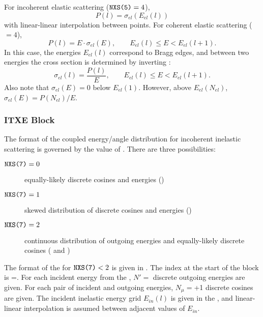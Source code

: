 For incoherent elastic scattering ($\texttt{NXS(5)}=4$),
\begin{equation}
  P(l) = \sigma_{el}(E_{el}(l))
\end{equation}
with linear-linear interpolation between points. For coherent elastic scattering ($=4$),
\begin{equation}
  P(l) = E\cdot\sigma_{el}(E), \qquad E_{el}(l) \le E < E_{el}(l+1).
  \label{eq:CoherentP}
\end{equation}
In this case, the energies $E_{el}(l)$ correspond to Bragg edges, and between two energies the cross section
is determined by inverting :
\begin{equation}
  \sigma_{el}(l) = \frac{P(l)}{E}, \qquad E_{el}(l) \le E < E_{el}(l+1).
\end{equation}
Also note that $\sigma_{el}(E)=0$ below $E_{el}(1)$. However, above $E_{el}(N_{el})$, $\sigma_{el}(E) = P(N_{el})/E$.

\subsubsection{\textsf{ITXE} Block}\label{sec:ITXEBlock}

The format of the coupled energy/angle distribution for incoherent inelastic scattering is governed by the value
of . There are three possibilities:
\begin{description}
  \item[$\texttt{NXS(7)}=0$] equally-likely discrete cosines and energies ()
  \item[$\texttt{NXS(7)}=1$] skewed distribution of discrete cosines and energies ()
  \item[$\texttt{NXS(7)}=2$] continuous distribution of outgoing energies and equally-likely discrete cosines
                     ( and )
\end{description}

The format of the  for $\texttt{NXS(7)}<2$ is given in . The index at the start of the
block is =. For each incident energy from the , $N'=$ discrete outgoing
energies are given. For each pair of incident and outgoing energies, $N_\mu=$+1 discrete cosines are given.
The incident inelastic energy grid $E_{in}(l)$ is given in the , and linear-linear interpolation is assumed
between adjacent values of $E_{in}$.

